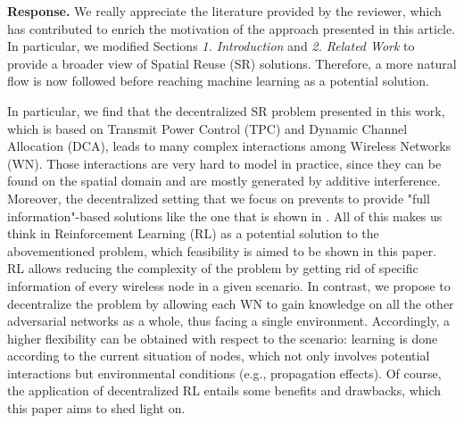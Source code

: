 \documentclass[a4paper,twoside,11pt]{reviewresponse}
\begin{document}
\textbf{Response.} We really appreciate the literature provided by the reviewer, which has contributed to enrich the motivation of the approach presented in this article. In particular, we modified Sections \textit{1. Introduction} and \textit{2. Related Work} to provide a broader view of Spatial Reuse (SR) solutions. Therefore, a more natural flow is now followed before reaching machine learning as a potential solution.

In particular, we find that the decentralized SR problem presented in this work, which is based on Transmit Power Control (TPC) and Dynamic Channel Allocation (DCA), leads to many complex interactions among Wireless Networks (WN). Those interactions are very hard to model in practice, since they can be found on the spatial domain and are mostly generated by additive interference. Moreover, the decentralized setting that we focus on prevents to provide "full information"-based solutions like the one that is shown in \cite{tang2014joint}. All of this makes us think in Reinforcement Learning (RL) as a potential solution to the abovementioned problem, which feasibility is aimed to be shown in this paper. RL allows reducing the complexity of the problem by getting rid of specific information of every wireless node in a given scenario. In contrast, we propose to decentralize the problem by allowing each WN to gain knowledge on all the other adversarial networks as a whole, thus facing a single environment. Accordingly, a higher flexibility can be obtained with respect to the scenario: learning is done according to the current situation of nodes, which not only involves potential interactions but environmental conditions (e.g., propagation effects). Of course, the application of decentralized RL entails some benefits and drawbacks, which this paper aims to shed light on.

\end{document}
